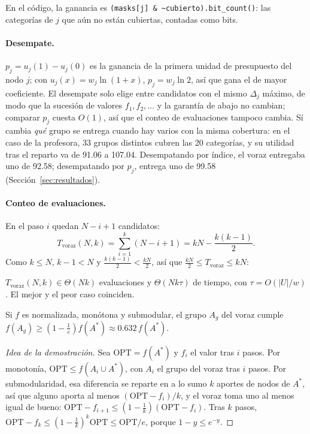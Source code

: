 En el código, la ganancia es \texttt{(masks[j] \& \textasciitilde cubierto).bit\_count()}: las
categorías de $j$ que aún no están cubiertas, contadas como bits.

\paragraph{Desempate.} $p_j=u_j(1)-u_j(0)$ es la ganancia de la primera unidad de presupuesto del
nodo $j$; con $u_j(x)=w_j\ln(1+x)$, $p_j=w_j\ln2$, así que gana el de mayor coeficiente. El
desempate solo elige entre candidatos con el mismo $\Delta_j$ máximo, de modo que la sucesión de
valores $f_1,f_2,\dots$ y la garantía de abajo no cambian; comparar $p_j$ cuesta $O(1)$, así que el
conteo de evaluaciones tampoco cambia. Sí cambia \emph{qué} grupo se entrega cuando hay varios con
la misma cobertura: en el caso de la profesora, 33 grupos distintos cubren las 20 categorías, y su
utilidad tras el reparto va de 91.06 a 107.04. Desempatando por índice, el voraz entregaba uno de
92.58; desempatando por $p_j$, entrega uno de 99.58 (Sección~\ref{sec:resultados}).

\paragraph{Conteo de evaluaciones.} En el paso $i$ quedan $N-i+1$ candidatos:
\[
  T_{\text{voraz}}(N,k)=\sum_{i=1}^{k}(N-i+1)=kN-\frac{k(k-1)}{2}.
\]
Como $k\le N$, $k-1<N$ y $\frac{k(k-1)}{2}<\frac{kN}{2}$, así que $\frac{kN}{2}\le T_{\text{voraz}}\le kN$:
\begin{clave}
$T_{\text{voraz}}(N,k)\in\Theta(N k)$ evaluaciones y $\Theta(Nk\tau)$ de tiempo, con $\tau=O(|U|/w)$.
El mejor y el peor caso coinciden.
\end{clave}

\begin{teorema}
Si $f$ es normalizada, monótona y submodular, el grupo $A_g$ del voraz cumple
$f(A_g)\ge\left(1-\frac1e\right)f(A^*)\approx 0.632\,f(A^*)$.
\end{teorema}
\begin{proof}[Idea de la demostración]
Sea $\mathrm{OPT}=f(A^*)$ y $f_i$ el valor tras $i$ pasos. Por monotonía,
$\mathrm{OPT}\le f(A_i\cup A^*)$, con $A_i$ el grupo del voraz tras $i$ pasos. Por submodularidad, esa diferencia se reparte en a lo sumo $k$
aportes de nodos de $A^*$, así que alguno aporta al menos $(\mathrm{OPT}-f_i)/k$, y el voraz toma
uno al menos igual de bueno: $\mathrm{OPT}-f_{i+1}\le(1-\frac1k)(\mathrm{OPT}-f_i)$. Tras $k$ pasos,
$\mathrm{OPT}-f_k\le(1-\frac1k)^k\mathrm{OPT}\le\mathrm{OPT}/e$, porque $1-y\le e^{-y}$.
\end{proof}

